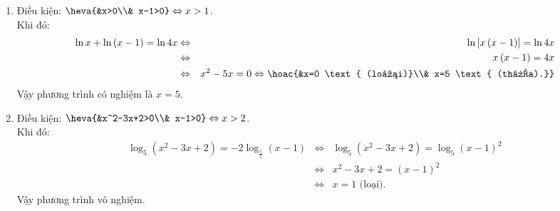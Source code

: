 \begin{bt}
{\begin{enumerate}
{\begin{eqnarray*}
		\end{eqnarray*}} 
		Vậy phương trình có nghiệm là $x=4$.
		\item Điều kiện: $\heva{&x>0\\& x-1>0} \Leftrightarrow x>1$.\\
		Khi đó: {\allowdisplaybreaks
			\begin{eqnarray*}
			\ln x+\ln \left(x-1\right)=\ln 4x &\Leftrightarrow& \ln \left[x\left(x-1\right)\right]=\ln 4x\\
			&\Leftrightarrow& x\left(x-1\right)=4x\\ &\Leftrightarrow& x^2-5x=0 \Leftrightarrow \hoac{&x=0 \text{ (loại)}\\& x=5 \text{ (thỏa).}}
		\end{eqnarray*}}
	Vậy phương trình có nghiệm là $x=5$.
		\item Điều kiện: $\heva{&x^2-3x+2>0\\& x-1>0} \Leftrightarrow x>2$.\\
		Khi đó: {\allowdisplaybreaks
			\begin{eqnarray*}
			\log_5 \left(x^2-3x+2\right)=-2\log_{\tfrac{1}{5}}\left(x-1\right) &\Leftrightarrow& \log_5 \left(x^2-3x+2\right)=\log_{5}\left(x-1\right)^2 \\
			&\Leftrightarrow& x^2-3x+2=\left(x-1\right)^2\\ &\Leftrightarrow& x=1 \text{ (loại).}	
		\end{eqnarray*}} 
		Vậy phương trình vô nghiệm.
	\end{enumerate}
}
\end{bt}
